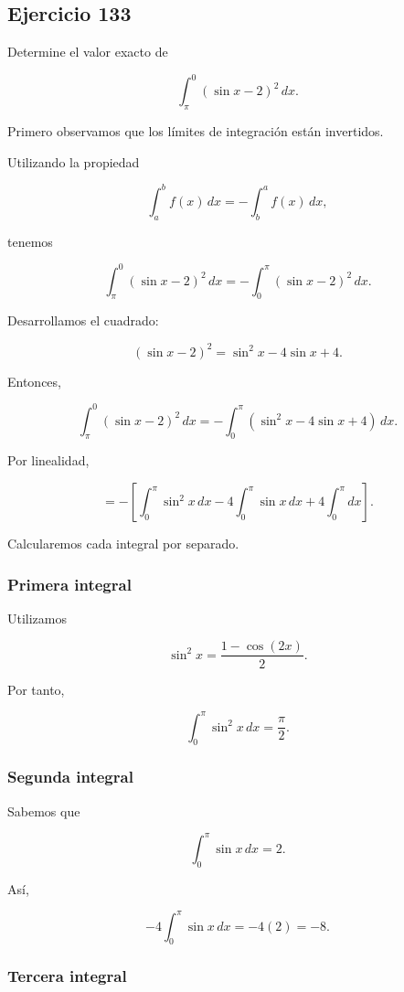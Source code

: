 \documentclass[12pt]{article}
\begin{document}
\subsection*{Ejercicio 133}

Determine el valor exacto de

\[
\int_\pi^0(\sin x-2)^2\,dx.
\]

Primero observamos que los límites de integración están invertidos.

Utilizando la propiedad

\[
\int_a^b f(x)\,dx
=
-\int_b^a f(x)\,dx,
\]

tenemos

\[
\int_\pi^0(\sin x-2)^2\,dx
=
-\int_0^\pi(\sin x-2)^2\,dx.
\]

Desarrollamos el cuadrado:

\[
(\sin x-2)^2
=
\sin^2x-4\sin x+4.
\]

Entonces,

\[
\int_\pi^0(\sin x-2)^2\,dx
=
-
\int_0^\pi
\left(
\sin^2x-4\sin x+4
\right)\,dx.
\]

Por linealidad,

\[
=
-
\left[
\int_0^\pi\sin^2x\,dx
-
4\int_0^\pi\sin x\,dx
+
4\int_0^\pi dx
\right].
\]

Calcularemos cada integral por separado.

\subsubsection*{Primera integral}

Utilizamos

\[
\sin^2x
=
\frac{1-\cos(2x)}{2}.
\]

Por tanto,

\[
\int_0^\pi\sin^2x\,dx
=
\frac{\pi}{2}.
\]

\subsubsection*{Segunda integral}

Sabemos que

\[
\int_0^\pi\sin x\,dx=2.
\]

Así,

\[
-4\int_0^\pi\sin x\,dx
=
-4(2)
=
-8.
\]

\subsubsection*{Tercera integral}
\end{document}
